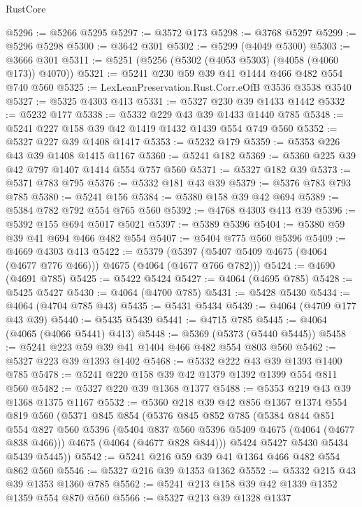 \begin{lexlean}{RustCore}
\begin{coremodule}
@5296 := @5266 @5295
@5297 := @3572 @173
@5298 := @3768 @5297
@5299 := @5296 @5298
@5300 := @3642 @301
@5302 := @5299 (@4049 @5300)
@5303 := @3666 @301
@5311 := @5251 (@5256 (@5302 (@4053 @5303) (@4058 (@4060 @173)) @4070))
@5321 := @5241 @230 @59 @39 @41 @1444 @466 @482 @554 @740 @560
@5325 := LexLeanPreservation.Rust.Corr.eOfB @3536 @3538 @3540
@5327 := @5325 @4303 @413
@5331 := @5327 @230 @39 @1433 @1442
@5332 := @5232 @177
@5338 := @5332 @229 @43 @39 @1433 @1440 @785
@5348 := @5241 @227 @158 @39 @42 @1419 @1432 @1439 @554 @749 @560
@5352 := @5327 @227 @39 @1408 @1417
@5353 := @5232 @179
@5359 := @5353 @226 @43 @39 @1408 @1415 @1167
@5360 := @5241 @182
@5369 := @5360 @225 @39 @42 @797 @1407 @1414 @554 @757 @560
@5371 := @5327 @182 @39
@5373 := @5371 @783 @795
@5376 := @5332 @181 @43 @39
@5379 := @5376 @783 @793 @785
@5380 := @5241 @156
@5384 := @5380 @158 @39 @42 @694
@5389 := @5384 @782 @792 @554 @765 @560
@5392 := @4768 @4303 @413 @39
@5396 := @5392 @155 @694 @5017 @5021
@5397 := @5389 @5396
@5404 := @5380 @59 @39 @41 @694 @466 @482 @554
@5407 := @5404 @775 @560 @5396
@5409 := @4669 @4303 @413
@5422 := @5379 (@5397 (@5407 @5409 @4675 (@4064 (@4677 @776 @466))) @4675 (@4064 (@4677 @766 @782)))
@5424 := @4690 (@4691 @785)
@5425 := @5422 @5424
@5427 := @4064 (@4695 @785)
@5428 := @5425 @5427
@5430 := @4064 (@4700 @785)
@5431 := @5428 @5430
@5434 := @4064 (@4704 @785 @43)
@5435 := @5431 @5434
@5439 := @4064 (@4709 @177 @43 @39)
@5440 := @5435 @5439
@5441 := @4715 @785
@5445 := @4064 (@4065 (@4066 @5441) @413)
@5448 := @5369 (@5373 (@5440 @5445))
@5458 := @5241 @223 @59 @39 @41 @1404 @466 @482 @554 @803 @560
@5462 := @5327 @223 @39 @1393 @1402
@5468 := @5332 @222 @43 @39 @1393 @1400 @785
@5478 := @5241 @220 @158 @39 @42 @1379 @1392 @1399 @554 @811 @560
@5482 := @5327 @220 @39 @1368 @1377
@5488 := @5353 @219 @43 @39 @1368 @1375 @1167
@5532 := @5360
    @218
    @39
    @42
    @856
    @1367
    @1374
    @554
    @819
    @560
    (@5371
      @845
      @854
      (@5376
        @845
        @852
        @785
        (@5384
          @844
          @851
          @554
          @827
          @560
          @5396
          (@5404 @837 @560 @5396 @5409 @4675 (@4064 (@4677 @838 @466)))
          @4675
          (@4064 (@4677 @828 @844)))
        @5424
        @5427
        @5430
        @5434
        @5439
        @5445))
@5542 := @5241 @216 @59 @39 @41 @1364 @466 @482 @554 @862 @560
@5546 := @5327 @216 @39 @1353 @1362
@5552 := @5332 @215 @43 @39 @1353 @1360 @785
@5562 := @5241 @213 @158 @39 @42 @1339 @1352 @1359 @554 @870 @560
@5566 := @5327 @213 @39 @1328 @1337

\end{coremodule}
\end{lexlean}
